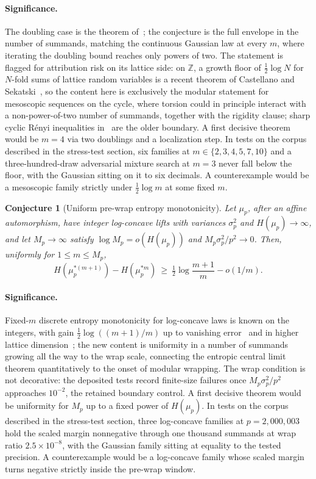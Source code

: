 \documentclass[11pt]{article}
\newtheorem{conjecture}{Conjecture}
\theoremstyle{definition}
\begin{document}
\paragraph{Significance.}
The doubling case is the theorem of~\cite{GGK26}; the conjecture is the full envelope in the number of summands, matching the continuous Gaussian law at every $m$, where iterating the doubling bound reaches only powers of two.  The statement is flagged for attribution risk on its lattice side: on $\mathbb Z$, a growth floor of $\tfrac12\log N$ for $N$-fold sums of lattice random variables is a recent theorem of Castellano and Sekatski~\cite{CS25}, so the content here is exclusively the modular statement for mesoscopic sequences on the cycle, where torsion could in principle interact with a non-power-of-two number of summands, together with the rigidity clause; sharp cyclic Rényi inequalities in~\cite{MWW21} are the older boundary.  A first decisive theorem would be $m=4$ via two doublings and a localization step.  In tests on the corpus described in the stress-test section, six families at $m\in\{2,3,4,5,7,10\}$ and a three-hundred-draw adversarial mixture search at $m=3$ never fall below the floor, with the Gaussian sitting on it to six decimals.  A counterexample would be a mesoscopic family strictly under $\tfrac12\log m$ at some fixed $m$.

\begin{conjecture}[Uniform pre-wrap entropy monotonicity]\label{ac15}
Let $\mu_p$, after an affine automorphism, have integer log-concave lifts with variances $\sigma_p^2$ and $H(\mu_p)\to\infty$, and let $M_p\to\infty$ satisfy $\log M_p=o(H(\mu_p))$ and $M_p\sigma_p^2/p^2\to0$.  Then, uniformly for $1\le m\le M_p$,
\[
H(\mu_p^{*(m+1)})-H(\mu_p^{*m})\ \ge\ \tfrac12\log\frac{m+1}m-o(1/m).
\]
\end{conjecture}

\paragraph{Significance.}
Fixed-$m$ discrete entropy monotonicity for log-concave laws is known on the integers, with gain $\tfrac12\log((m+1)/m)$ up to vanishing error~\cite{Gav23} and in higher lattice dimension~\cite{FGR24}; the new content is uniformity in a number of summands growing all the way to the wrap scale, connecting the entropic central limit theorem quantitatively to the onset of modular wrapping.  The wrap condition is not decorative: the deposited tests record finite-size failures once $M_p\sigma_p^2/p^2$ approaches $10^{-2}$, the retained boundary control.  A first decisive theorem would be uniformity for $M_p$ up to a fixed power of $H(\mu_p)$.  In tests on the corpus described in the stress-test section, three log-concave families at $p=2{,}000{,}003$ hold the scaled margin nonnegative through one thousand summands at wrap ratio $2.5\times10^{-8}$, with the Gaussian family sitting at equality to the tested precision.  A counterexample would be a log-concave family whose scaled margin turns negative strictly inside the pre-wrap window.
\end{document}
